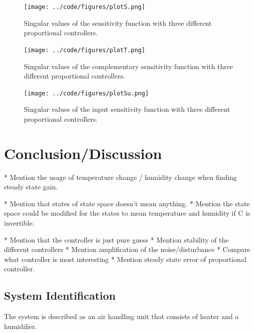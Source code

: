 \documentclass[a4paper, titlepage]{article}
\begin{document}
\begin{figure}[H]
\center
\texttt{[image: ../code/figures/plotS.png]}
\caption{Singular values of the sensitivity function with three different proportional controllers.}
\label{fig:plotS}
\end{figure}

\begin{figure}[H]
\center
\texttt{[image: ../code/figures/plotT.png]}
\caption{Singular values of the complementary sensitivity function with three different proportional controllers.}
\label{fig:plotT}
\end{figure}

\begin{figure}[H]
\center
\texttt{[image: ../code/figures/plotSu.png]}
\caption{Singular values of the input sensitivity function with three different proportional controllers.}
\label{fig:plotSu}
\end{figure}


\section{Conclusion/Discussion}
* Mention the usage of temperature change / humidity change when finding steady state gain.

* Mention that states of state space doesn't mean anything.
* Mention the state space could be modified for the states to mean temperature and humidity if C is invertible.

* Mention that the controller is just pure guess
* Mention stability of the different controllers
* Mention amplification of the noise/disturbance
* Compare what controller is most interesting
* Mention steady state error of proportional controller.

\subsection{System Identification}



The system is described as an air handling unit that consists of heater and a humidifier.
\end{document}
